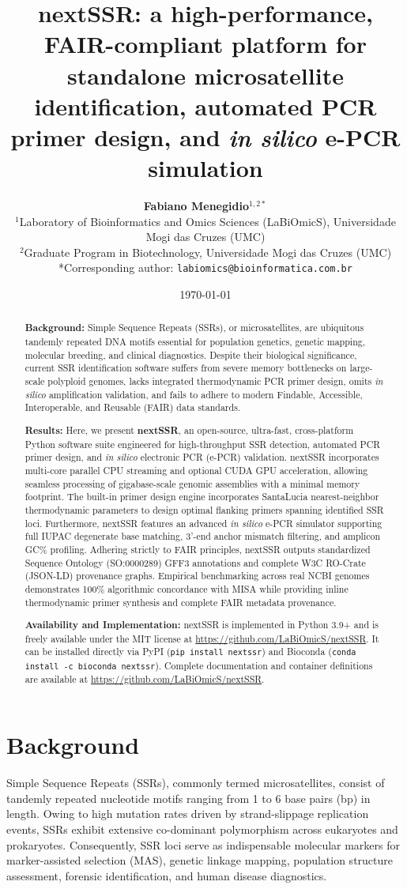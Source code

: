 \documentclass[fullpage]{article}
\title{\textbf{nextSSR: a high-performance, FAIR-compliant platform for standalone microsatellite identification, automated PCR primer design, and \textit{in silico} e-PCR simulation}}
\author{
  \textbf{Fabiano Menegidio}$^{1,2*}$\\
  $^{1}$Laboratory of Bioinformatics and Omics Sciences (LaBiOmicS), Universidade Mogi das Cruzes (UMC)\\
  $^{2}$Graduate Program in Biotechnology, Universidade Mogi das Cruzes (UMC)\\
  \small{*Corresponding author: \texttt{labiomics@bioinformatica.com.br}}
}
\date{\today}
\begin{document}
\maketitle

\begin{abstract}
\textbf{Background:} Simple Sequence Repeats (SSRs), or microsatellites, are ubiquitous tandemly repeated DNA motifs essential for population genetics, genetic mapping, molecular breeding, and clinical diagnostics. Despite their biological significance, current SSR identification software suffers from severe memory bottlenecks on large-scale polyploid genomes, lacks integrated thermodynamic PCR primer design, omits \textit{in silico} amplification validation, and fails to adhere to modern Findable, Accessible, Interoperable, and Reusable (FAIR) data standards.

\textbf{Results:} Here, we present \textbf{nextSSR}, an open-source, ultra-fast, cross-platform Python software suite engineered for high-throughput SSR detection, automated PCR primer design, and \textit{in silico} electronic PCR (e-PCR) validation. nextSSR incorporates multi-core parallel CPU streaming and optional CUDA GPU acceleration, allowing seamless processing of gigabase-scale genomic assemblies with a minimal memory footprint. The built-in primer design engine incorporates SantaLucia nearest-neighbor thermodynamic parameters to design optimal flanking primers spanning identified SSR loci. Furthermore, nextSSR features an advanced \textit{in silico} e-PCR simulator supporting full IUPAC degenerate base matching, 3'-end anchor mismatch filtering, and amplicon GC\% profiling. Adhering strictly to FAIR principles, nextSSR outputs standardized Sequence Ontology (SO:0000289) GFF3 annotations and complete W3C RO-Crate (JSON-LD) provenance graphs. Empirical benchmarking across real NCBI genomes demonstrates 100\% algorithmic concordance with MISA while providing inline thermodynamic primer synthesis and complete FAIR metadata provenance.

\textbf{Availability and Implementation:} nextSSR is implemented in Python 3.9+ and is freely available under the MIT license at \url{https://github.com/LaBiOmicS/nextSSR}. It can be installed directly via PyPI (\texttt{pip install nextssr}) and Bioconda (\texttt{conda install -c bioconda nextssr}). Complete documentation and container definitions are available at \url{https://github.com/LaBiOmicS/nextSSR}.
\end{abstract}

\section*{Background}
Simple Sequence Repeats (SSRs), commonly termed microsatellites, consist of tandemly repeated nucleotide motifs ranging from 1 to 6 base pairs (bp) in length. Owing to high mutation rates driven by strand-slippage replication events, SSRs exhibit extensive co-dominant polymorphism across eukaryotes and prokaryotes. Consequently, SSR loci serve as indispensable molecular markers for marker-assisted selection (MAS), genetic linkage mapping, population structure assessment, forensic identification, and human disease diagnostics.
\end{document}
